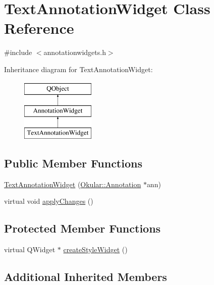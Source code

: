 \hypertarget{classTextAnnotationWidget}{\section{Text\+Annotation\+Widget Class Reference}
\label{classTextAnnotationWidget}
}


{\ttfamily \#include $<$annotationwidgets.\+h$>$}

Inheritance diagram for Text\+Annotation\+Widget\+:\begin{figure}[H]
\begin{center}
\leavevmode
\includegraphics[height=3.000000cm]{classTextAnnotationWidget}
\end{center}
\end{figure}
\subsection*{Public Member Functions}
\begin{DoxyCompactItemize}
\item 
\hyperlink{classTextAnnotationWidget_a8b00991c90479e325b77fa14a2e13fc1}{Text\+Annotation\+Widget} (\hyperlink{classOkular_1_1Annotation}{Okular\+::\+Annotation} $\ast$ann)
\item 
virtual void \hyperlink{classTextAnnotationWidget_ae0b433d806d3e939300acbc2480be586}{apply\+Changes} ()
\end{DoxyCompactItemize}
\subsection*{Protected Member Functions}
\begin{DoxyCompactItemize}
\item 
virtual Q\+Widget $\ast$ \hyperlink{classTextAnnotationWidget_a2139c36fddba889da7fef68a6febef61}{create\+Style\+Widget} ()
\end{DoxyCompactItemize}
\subsection*{Additional Inherited Members}


